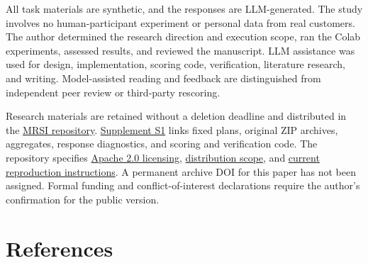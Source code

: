 \documentclass[10pt,a4paper]{article}
\begin{document}
All task materials are synthetic, and the responses are LLM-generated. The study involves no human-participant experiment or personal data from real customers. The author determined the research direction and execution scope, ran the Colab experiments, assessed results, and reviewed the manuscript. LLM assistance was used for design, implementation, scoring code, verification, literature research, and writing. Model-assisted reading and feedback are distinguished from independent peer review or third-party rescoring.

Research materials are retained without a deletion deadline and distributed in the \href{https://github.com/metaSATOKEN/MRSI}{MRSI repository}. \href{https://github.com/metaSATOKEN/MRSI/blob/9443de315d283874df0c27e0e99b8c04f400709d/papers/paper-03/evidence-index-en-v0.1-2026-09-29.md}{Supplement S1} links fixed plans, original ZIP archives, aggregates, response diagnostics, and scoring and verification code. The repository specifies \href{https://github.com/metaSATOKEN/MRSI/blob/9443de315d283874df0c27e0e99b8c04f400709d/LICENSE_STATUS.md}{Apache 2.0 licensing}, \href{https://github.com/metaSATOKEN/MRSI/blob/9443de315d283874df0c27e0e99b8c04f400709d/PUBLICATION_SCOPE.md}{distribution scope}, and \href{https://github.com/metaSATOKEN/MRSI/blob/9443de315d283874df0c27e0e99b8c04f400709d/RUNNING.md}{current reproduction instructions}. A permanent archive DOI for this paper has not been assigned. Formal funding and conflict-of-interest declarations require the author's confirmation for the public version.

\clearpage

\begingroup\raggedright

\section{References}\label{paper-03-references}
\end{document}
